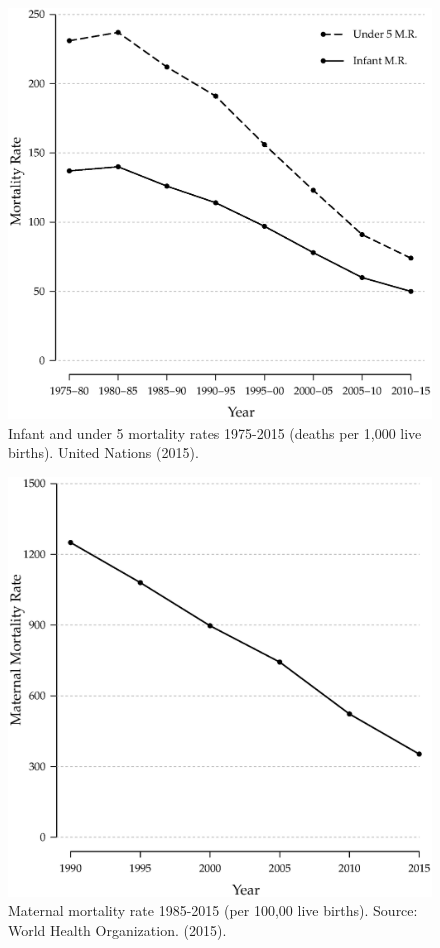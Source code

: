 \documentclass[a4paper, twocolumn]{article}
\begin{document}
\begin{figure}[!hbtp]
\includegraphics[width = \columnwidth]{../figures/fig2.eps}
\caption{Infant and under 5 mortality rates 1975-2015 (deaths per 1,000 live births).  United Nations (2015).}\label{Fig:2}
\end{figure}




\begin{figure}[!hbtp]
\includegraphics[width = \columnwidth]{../figures/fig3.eps}
\caption{Maternal mortality rate 1985-2015 (per 100,00 live births). Source: World Health Organization. (2015).} \label{Fig:3}
\end{figure}
\end{document}
